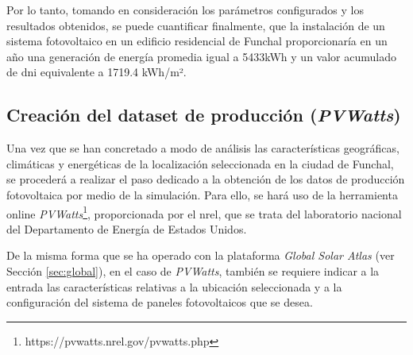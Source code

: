 \pagebreak

Por lo tanto, tomando en consideración los parámetros configurados y los resultados obtenidos, se puede cuantificar finalmente, que la instalación de un sistema fotovoltaico en un edificio residencial de Funchal proporcionaría en un año una generación de energía promedia igual a 5433kWh y un valor acumulado de \gls{dni} equivalente a 1719.4 kWh/m².

\vspace{3mm}







\subsection{Creación del dataset de producción (\textit{PVWatts})}
\label{sec:pvw}

Una vez que se han concretado a modo de análisis las características geográficas, climáticas y energéticas de la localización seleccionada en la ciudad de Funchal, se procederá a realizar el paso dedicado a la obtención de los datos de producción fotovoltaica por medio de la simulación. Para ello, se hará uso de la herramienta online \textit{PVWatts}\footnote{https://pvwatts.nrel.gov/pvwatts.php}, proporcionada por el \gls{nrel}, que se trata del laboratorio nacional del Departamento de Energía de Estados Unidos. \cite{pvwatts}

\vspace{3mm}

De la misma forma que se ha operado con la plataforma \textit{Global Solar Atlas} (ver Sección \ref{sec:global}), en el caso de \textit{PVWatts}, también se requiere indicar a la entrada las características relativas a la ubicación seleccionada y a la configuración del sistema de paneles fotovoltaicos que se desea. 

